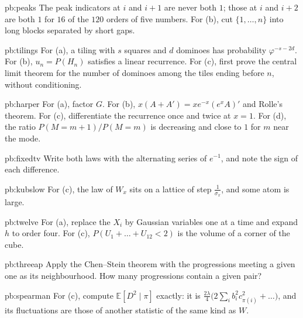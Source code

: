 \begin{hint}{pb:peaks}
The peak indicators at $i$ and $i+1$ are never both $1$; those at $i$ and $i+2$ are both $1$ for $16$ of the $120$ orders of five numbers. For (b), cut
$\{1,\dots,n\}$ into long blocks separated by short gaps.
\end{hint}

\begin{hint}{pb:tilings}
For (a), a tiling with $s$ squares and $d$ dominoes has probability $\varphi^{-s-2d}$. For (b), $u_n=P(H_n)$ satisfies a linear recurrence. For (c), first prove
the central limit theorem for the number of dominoes among the tiles ending before $n$, without conditioning.
\end{hint}

\begin{hint}{pb:harper}
For (a), factor $G$. For (b), $x(A+A')=xe^{-x}(e^xA)'$ and Rolle's theorem. For (c), differentiate the recurrence once and twice at $x=1$.
For (d), the ratio $P(M=m+1)/P(M=m)$ is decreasing and close to $1$ for $m$ near the mode.
\end{hint}

\begin{hint}{pb:fixedtv}
Write both laws with the alternating series of $e^{-1}$, and note the sign of each difference.
\end{hint}

\begin{hint}{pb:kubslow}
For (c), the law of $W_x$ sits on a lattice of step $\frac1{\sigma_x}$, and some atom is large.
\end{hint}

\begin{hint}{pb:twelve}
For (a), replace the $X_i$ by Gaussian variables one at a time and expand $h$ to order four. For (c), $P(U_1+\dots+U_{12}<2)$ is the volume of a corner of the cube.
\end{hint}

\begin{hint}{pb:threeap}
Apply the Chen--Stein theorem with the progressions meeting a given one as its neighbourhood. How many progressions contain a given pair?
\end{hint}

\begin{hint}{pb:spearman}
For (c), compute $\mathbb E[D^2\mid\pi]$ exactly: it is $\frac{2\lambda}4\bigl(2\sum_ib_i^2c_{\pi(i)}^2+\dots\bigr)$, and its fluctuations are those of another statistic of the
same kind as $W$.
\end{hint}


